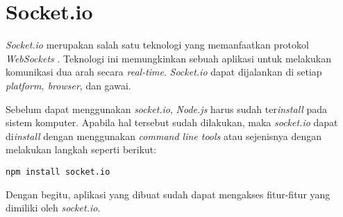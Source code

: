 %
%
%	
%	
%	


\section{Socket.io}
\label{sec:Socket.io}

\textit{Socket.io} merupakan salah satu teknologi yang memanfaatkan protokol \textit{WebSockets} \cite{rauch:11:socketio}. Teknologi ini memungkinkan sebuah aplikasi untuk melakukan komunikasi dua arah secara \textit{real-time}. \textit{Socket.io} dapat dijalankan di setiap \textit{platform, browser}, dan gawai.

Sebelum dapat menggunakan \textit{socket.io}, \textit{Node.js} harus sudah ter\textit{install} pada sistem komputer. Apabila hal tersebut sudah dilakukan, maka \textit{socket.io} dapat di\textit{install} dengan menggunakan \textit{command line tools} atau sejenisnya dengan melakukan langkah seperti berikut:
\begin{lstlisting}
npm install socket.io
\end{lstlisting}

Dengan begitu, aplikasi yang dibuat sudah dapat mengakses fitur-fitur yang dimiliki oleh \textit{socket.io}.

